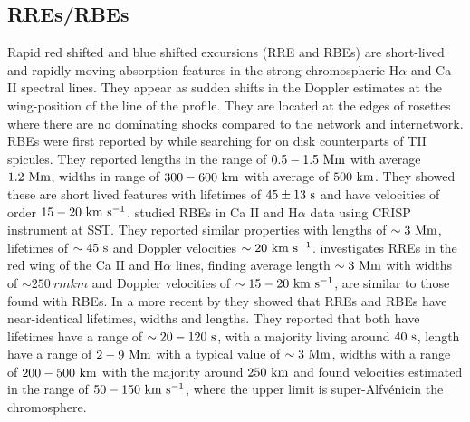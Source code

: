 \documentclass[12pt]{ociamthesis}
\newcommand{\Alfvenic}{Alfv\'{e}nic}
\newcommand{\kms}{~\rm{km ~s^{-1}}}
\newcommand{\np}{\\ \\}
\begin{document}
\subsection{RREs/RBEs}
\label{subsec:rbe}
Rapid red shifted and blue shifted excursions (RRE and RBEs) are short-lived and rapidly moving absorption features in the strong chromospheric H$\alpha$ and Ca II spectral lines. They appear as sudden shifts in the Doppler estimates at the wing-position of the line of the profile. They are located at the edges of rosettes where there are no dominating shocks compared to the network and internetwork. RBEs were first reported by \cite{Langangen2008ApJ} while searching for on disk counterparts of TII spicules. They reported lengths in the range of $0.5-1.5~\rm{Mm}$ with average $1.2~\rm{Mm}$, widths in range of $300-600~\rm{km}$ with average of $500~\rm{km}$. They showed these are short lived features with lifetimes of $45\pm13~\rm{s}$ and have velocities of order $15-20\kms$.\cite{Rouppe2009ApJ} studied RBEs in Ca II and H$\alpha$ data using CRISP instrument at SST. They reported similar properties with lengths of $\sim 3~\rm{Mm}$, lifetimes of $\sim 45~\rm{s}$ and Doppler velocities $\sim 20\kms$. \cite{Sekse2013ApJ76944S,Sekse2013ApJ764164S} investigates RREs in the red wing of the  Ca II and H$\alpha$ lines, finding average length $\sim 3~\rm{Mm}$ with widths of $\sim 250~rm{km}$ and Doppler velocities of $\sim 15-20\kms$, are similar to those found with RBEs.  In a more recent by \cite{Kuridze2015ApJ80226K} they showed that RREs and RBEs have near-identical lifetimes, widths and lengths. They reported that both have lifetimes have a range of $\sim 20-120~\rm{s}$, with a majority living around $40~\rm{s}$, length have a range of $2-9~\rm{Mm}$ with a typical value of $\sim 3~\rm{Mm}$, widths with a range of $200-500~\rm{km}$ with the majority around $250~\rm{km}$ and found velocities estimated in the range of $50-150\kms$, where the upper limit is super-\Alfvenic in the chromosphere. \np
%
\end{document}
